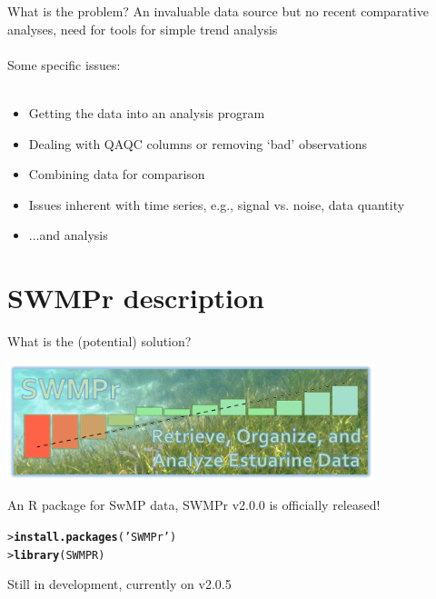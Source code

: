 \documentclass[serif]{beamer}\usepackage[]{graphicx}\usepackage[]{color}
\makeatletter
\newcommand{\hlstr}[1]{\textcolor[rgb]{0.192,0.494,0.8}{#1}}%
\newcommand{\hlstd}[1]{\textcolor[rgb]{0.345,0.345,0.345}{#1}}%
\newcommand{\hlkwd}[1]{\textcolor[rgb]{0.737,0.353,0.396}{\textbf{#1}}}%
\newenvironment{kframe}{%
 \def\at@end@of@kframe{}%
 \ifinner\ifhmode%
  \def\at@end@of@kframe{\end{minipage}}%
  \begin{minipage}{\columnwidth}%
 \fi\fi%
 \def\FrameCommand##1{\hskip\@totalleftmargin \hskip-\fboxsep
 \colorbox{shadecolor}{##1}\hskip-\fboxsep
     \hskip-\linewidth \hskip-\@totalleftmargin \hskip\columnwidth}%
 \MakeFramed {\advance\hsize-\width
   \@totalleftmargin\z@ \linewidth\hsize
   \@setminipage}}%
 {\par\unskip\endMakeFramed%
 \at@end@of@kframe}
\newenvironment{knitrout}{}{} %
\makeatother
\begin{document}
\begin{frame}{What is the problem?}
An invaluable data source but no recent comparative analyses, need for tools for simple trend analysis \\~\\
Some specific issues:\\~\\
\begin{itemize}
\item Getting the data into an analysis program
\item Dealing with QAQC columns or removing `bad' observations
\item Combining data for comparison
\item Issues inherent with time series, e.g., signal vs. noise, data quantity
\item ...and analysis
\end{itemize}
\end{frame}

\section{SWMPr description}

\begin{frame}[fragile]{What is the (potential) solution?}
\centerline{\includegraphics[width = 0.8\textwidth]{fig/swmpr_logo.png}}
\vspace{0.15in}
An R package for SwMP data, SWMPr v2.0.0 is officially released!
\begin{knitrout}
\color{fgcolor}\begin{kframe}
\begin{alltt}
\hlstd{> }\hlkwd{install.packages}\hlstd{(}\hlstr{'SWMPr'}\hlstd{)}
\hlstd{> }\hlkwd{library}\hlstd{(SWMPR)}
\end{alltt}
\end{kframe}
\end{knitrout}
Still in development, currently on v2.0.5
\end{frame}
\end{document}
